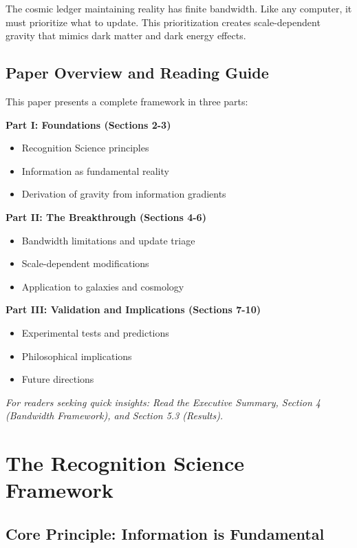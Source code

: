 \documentclass[12pt,letterpaper]{article}
\begin{document}
\begin{tcolorbox}[keyresult]
The cosmic ledger maintaining reality has finite bandwidth. Like any computer, it must prioritize what to update. This prioritization creates scale-dependent gravity that mimics dark matter and dark energy effects.
\end{tcolorbox}

\subsection{Paper Overview and Reading Guide}

This paper presents a complete framework in three parts:

\textbf{Part I: Foundations (Sections 2-3)}
\begin{itemize}
    \item Recognition Science principles
    \item Information as fundamental reality
    \item Derivation of gravity from information gradients
\end{itemize}

\textbf{Part II: The Breakthrough (Sections 4-6)}
\begin{itemize}
    \item Bandwidth limitations and update triage
    \item Scale-dependent modifications
    \item Application to galaxies and cosmology
\end{itemize}

\textbf{Part III: Validation and Implications (Sections 7-10)}
\begin{itemize}
    \item Experimental tests and predictions
    \item Philosophical implications
    \item Future directions
\end{itemize}

\textit{For readers seeking quick insights: Read the Executive Summary, Section 4 (Bandwidth Framework), and Section 5.3 (Results).}

\newpage

\section{The Recognition Science Framework}

\subsection{Core Principle: Information is Fundamental}
\end{document}
